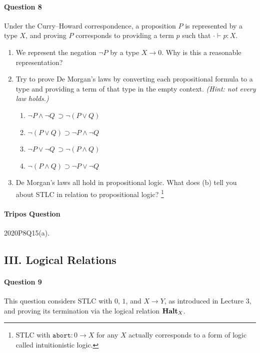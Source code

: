 \documentclass[11pt,a4paper,twoside]{article}
\begin{document}
\paragraph{Question 8}
Under the Curry--Howard correspondence, a proposition $P$ is represented by a
type $X$, and proving $P$ corresponds to providing a term $p$ such that $\cdot
\vdash p : X$.
\begin{enumerate}[label=(\alph*)]
  \item We represent the negation $\neg P$ by a type $X \to 0$. Why is
    this a reasonable representation?

  \item Try to prove De Morgan's laws by converting each propositional
    formula to a type and providing a term of that type in the empty
    context. \emph{(Hint: not every law holds.)}
    \begin{enumerate}[label=(\roman*)]
      \item $\neg P \land \neg Q \, \supset \neg (P \lor Q)$
      \item $\neg (P \lor Q) \supset \neg P \land \neg Q$
      \item $\neg P \lor \neg Q \, \supset \neg (P \land Q)$
      \item $\neg (P \land Q) \supset \neg P \lor \neg Q$
    \end{enumerate}

  \item De Morgan's laws all hold in propositional logic. What does (b)
    tell you about STLC in relation to propositional logic?
    \footnote{
      STLC with $\texttt{abort} : 0 \to X$ for any $X$ actually corresponds
    to a form of logic called intuitionistic logic.}
\end{enumerate}

\paragraph{Tripos Question} 2020P8Q15(a).

\subsection*{III. Logical Relations}

\paragraph{Question 9} This question considers STLC with $0$, $1$,
and $X \to Y$, as introduced in Lecture 3, and proving its
termination via the logical relation $\textbf{Halt}_X$.
\end{document}
